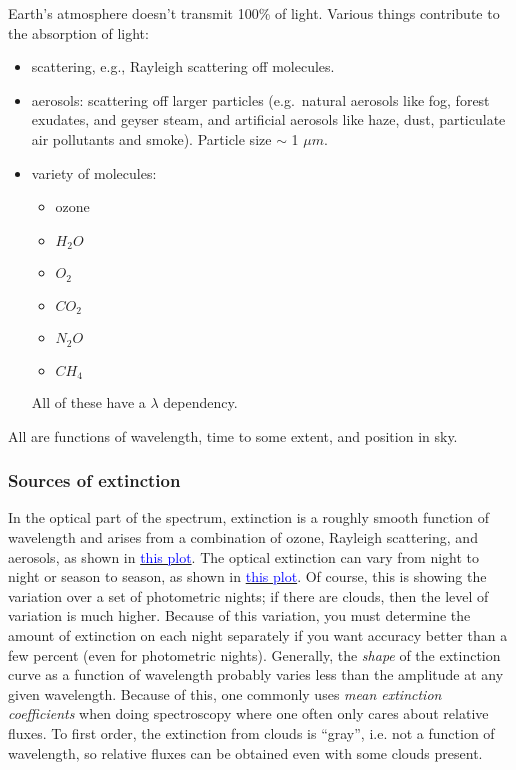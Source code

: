 \documentclass[12pt]{article}
\begin{document}
Earth's atmosphere doesn't transmit 100\% of light. Various things
contribute to the absorption of light:
\begin{itemize}
    \item scattering, e.g., Rayleigh scattering off molecules.
    \item aerosols: scattering off larger particles (e.g.\ natural
    aerosols like fog, forest exudates, and geyser steam, and
    artificial aerosols like haze, dust, particulate air pollutants
    and smoke). Particle size $\sim$ 1 $\mu m$.
    \item variety of molecules:
    \begin{itemize}
        \item ozone
        \item $H_2O$
        \item $O_2$
        \item $CO_2$
        \item $N_2O$
        \item $CH_4$
    \end{itemize}
    All of these have a $\lambda$ dependency.
\end{itemize}
All are functions of wavelength, time to some extent, and position in
sky.

\subsubsection*{Sources of extinction}
In the optical part of the spectrum, extinction is a roughly smooth
function of wavelength and arises from a combination of ozone,
Rayleigh scattering, and aerosols, as shown in
\href{http://astronomy.nmsu.edu/holtz/a535/html/diagrams/a535/extinct.htm}
{\textcolor{blue}{this plot}}.
The optical extinction can vary from night to night
or season to season, as shown in
\href{http://astronomy.nmsu.edu/holtz/a535/html/diagrams/a535/tauvar.htm}
{\textcolor{blue}{this plot}}.
Of course, this is showing the variation over a set of
photometric nights; if there are clouds, then the level of variation
is much higher. Because of this variation, you must determine the
amount of extinction on each night separately if you want accuracy
better than a few percent (even for photometric nights). Generally,
the \emph{shape} of the extinction curve as a function of wavelength probably
varies less than the amplitude at any given wavelength. Because of
this, one commonly uses \emph{mean extinction coefficients} when doing
spectroscopy where one often only cares about relative fluxes. To
first order, the extinction from clouds is ``gray'', i.e. not a
function of wavelength, so relative fluxes can be obtained even with
some clouds present.
\end{document}
